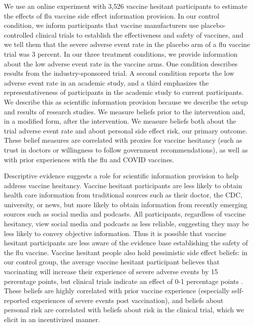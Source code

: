 We use an online experiment with 3,526 vaccine hesitant participants to estimate the effects of flu vaccine 
side effect information provision. In our control condition, we inform participants that vaccine manufacturers 
use placebo-controlled clinical trials to establish the effectiveness and safety of vaccines, 
and we tell them that the severe adverse event rate in the placebo arm of a flu vaccine trial was 3 percent.  
In our three treatment conditions,  we provide information about the low adverse event rate in the vaccine arms. 
One condition describes results from the industry-sponsored trial. A second condition reports the low adverse event rate 
in an academic study, and a third emphasizes the representativeness of participants in the academic 
study to current participants. We describe this as scientific information provision because we describe 
the setup and results of research studies.  We measure beliefs prior to the intervention and, in a modified form, 
after the intervention. We measure beliefs both about the trial adverse event rate and about personal 
side effect risk, our primary outcome. These belief measures are correlated with proxies for vaccine hesitancy 
(such as trust in doctors or willingness to follow government recommendations), as well as with prior experiences 
with the flu and COVID vaccines. 

Descriptive evidence suggests a role for scientific information provision to
help address vaccine hesitancy. Vaccine hesitant participants are less likely to obtain health 
care information from traditional sources such as their doctor, the CDC, university, or news, 
but more likely to obtain information from recently emerging sources such as social media 
and podcasts. All participants, regardless of vaccine hesitancy,  view social media and podcasts as 
less reliable, suggesting they may be less likely to convey objective information. 
Thus it is possible that vaccine hesitant participants are less aware of the evidence
base establishing the safety of the flu vaccine. Vaccine hesitant people also hold pessimistic 
side effect beliefs: in our control group, the average vaccine hesitant participant believes 
that vaccinating will increase their experience of severe adverse events by 15 
percentage points, but clinical trials indicate an effect of 0-1 percentage points 
\citep{fda_flulaval_package_insert,fda_fluzone_quadrivalent_package_insert}. These
beliefs are highly correlated with prior vaccine experience (especially self-reported
experiences of severe events post vaccination), and beliefs about personal risk
are correlated with beliefs about risk in the clinical trial, which we elicit in an 
incentivized manner. 


